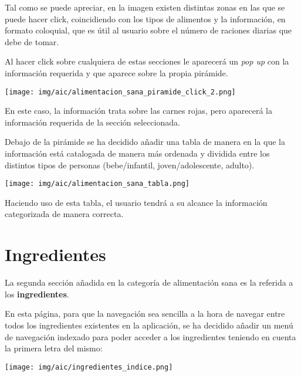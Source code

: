 \documentclass{\ClassPath/viu-tfm-template}
\begin{document}
Tal como se puede apreciar, en la imagen existen distintas zonas en las que se puede hacer click, coincidiendo con los tipos de alimentos y la información, en formato coloquial, que es útil al usuario sobre el número de raciones diarias que debe de tomar.

Al hacer click sobre cualquiera de estas secciones le aparecerá un \textit{pop up} con la información requerida y que aparece sobre la propia pirámide.

\begin{center}
    \vspace{-10pt}
    \texttt{[image: img/aic/alimentacion\_sana\_piramide\_click\_2.png]}
    \vspace{-20pt}
\end{center}

En este caso, la información trata sobre las carnes rojas, pero aparecerá la información requerida de la sección seleccionada.

Debajo de la pirámide se ha decidido añadir una tabla de manera en la que la información está catalogada de manera más ordenada y dividida entre los distintos tipos de personas (bebe/infantil, joven/adolescente, adulto).

\begin{center}
    \vspace{-10pt}
    \texttt{[image: img/aic/alimentacion\_sana\_tabla.png]}
    \vspace{-20pt}
\end{center}

Haciendo uso de esta tabla, el usuario tendrá a su alcance la información categorizada de manera correcta.


\section{Ingredientes}
La segunda sección añadida en la categoría de alimentación sana es la referida a los \textbf{ingredientes}.

En esta página, para que la navegación sea sencilla a la hora de navegar entre todos los ingredientes existentes en la aplicación, se ha decidido añadir un menú de navegación indexado para poder acceder a los ingredientes teniendo en cuenta la primera letra del mismo:


\begin{center}
    \vspace{-10pt}
    \texttt{[image: img/aic/ingredientes\_indice.png]}
    \vspace{-20pt}
\end{center}
\end{document}
